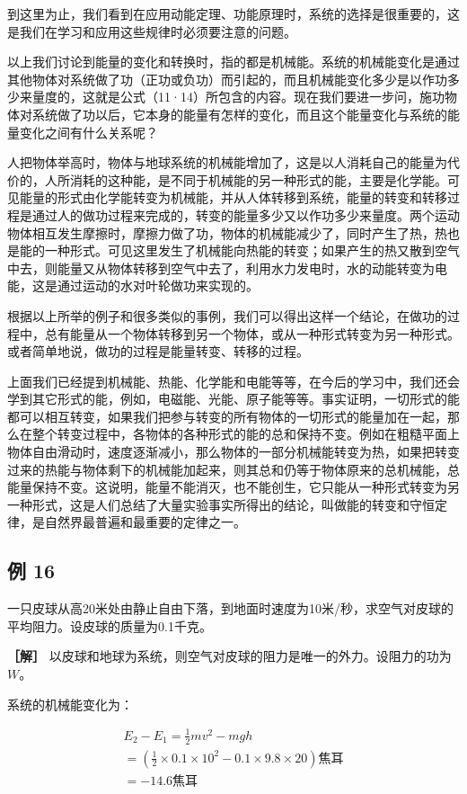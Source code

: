 到这里为止，我们看到在应用动能定理、功能原理时，系统的选择是很重要的，这是我们在学习和应用这些规律时必须要注意的问题。

以上我们讨论到能量的变化和转换时，指的都是机械能。系统的机械能变化是通过其他物体对系统做了功（正功或负功）而引起的，而且机械能变化多少是以作功多少来量度的，这就是公式（11·14）所包含的内容。现在我们要进一步问，施功物体对系统做了功以后，它本身的能量有怎样的变化，而且这个能量变化与系统的能量变化之间有什么关系呢？

人把物体举高时，物体与地球系统的机械能增加了，这是以人消耗自己的能量为代价的，人所消耗的这种能，是不同于机械能的另一种形式的能，主要是化学能。可见能量的形式由化学能转变为机械能，并从人体转移到系统，能量的转变和转移过程是通过人的做功过程来完成的，转变的能量多少又以作功多少来量度。两个运动物体相互发生摩擦时，摩擦力做了功，物体的机械能减少了，同时产生了热，热也是能的一种形式。可见这里发生了机械能向热能的转变；如果产生的热又散到空气中去，则能量又从物体转移到空气中去了，利用水力发电时，水的动能转变为电能，这是通过运动的水对叶轮做功来实现的。

根据以上所举的例子和很多类似的事例，我们可以得出这样一个结论，在做功的过程中，总有能量从一个物体转移到另一个物体，或从一种形式转变为另一种形式。或者简单地说，做功的过程是能量转变、转移的过程。

上面我们已经提到机械能、热能、化学能和电能等等，在今后的学习中，我们还会学到其它形式的能，例如，电磁能、光能、原子能等等。事实证明，一切形式的能都可以相互转变，如果我们把参与转变的所有物体的一切形式的能量加在一起，那么在整个转变过程中，各物体的各种形式的能的总和保持不变。例如在粗糙平面上物体自由滑动时，速度逐渐减小，那么物体的一部分机械能转变为热，如果把转变过来的热能与物体剩下的机械能加起来，则其总和仍等于物体原来的总机械能，总能量保持不变。这说明，能量不能消灭，也不能创生，它只能从一种形式转变为另一种形式，这是人们总结了大量实验事实所得出的结论，叫做能的转变和守恒定律，是自然界最普遍和最重要的定律之一。

\subsection{例 16}\label{ux4f8b-16-1}

一只皮球从高20米处由静止自由下落，到地面时速度为10米/秒，求空气对皮球的平均阻力。设皮球的质量为0.1千克。

\textbf{［解］}
以皮球和地球为系统，则空气对皮球的阻力是唯一的外力。设阻力的功为 \(W\)。

系统的机械能变化为：

\[
\begin{array}{l} E _ {2} - E _ {1} = \frac {1}{2} m v ^ {2} - m g h \\ = \left(\frac {1}{2} \times 0.1 \times 10 ^ {2} - 0.1 \times 9.8 \times 20\right) \text{焦耳} \\ = - 14.6 \text{焦耳} \\ \end{array}
\]

